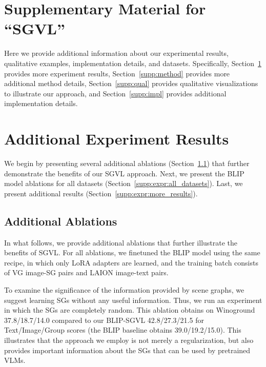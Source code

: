 \documentclass[11pt]{article}
\def\Secref#1{Section~\ref{#1}}
\newcommand{\minisection}[1]{\noindent{\textbf{#1}.}}
\newcommand{\smodel}{SGVL}
\def\Secref#1{Section~\ref{#1}}
\begin{document}






\newpage
\appendix
\clearpage
\renewcommand{\thefootnote}{\fnsymbol{footnote}}
\setcounter{page}{1} \setcounter{section}{0} \section*{Supplementary Material for ``SGVL''}




Here we provide additional information about our experimental results, qualitative examples, implementation details, and datasets. Specifically, \Secref{supp:expr} provides more experiment results, \Secref{supp:method} provides more additional method details, \Secref{supp:qual} provides qualitative visualizations to illustrate our approach, and \Secref{supp:impl} provides additional implementation details.




\section{Additional Experiment Results}
\label{supp:expr}

We begin by presenting several additional ablations (\Secref{supp:expr:more_ablt}) that further demonstrate the benefits of our {\smodel} approach. Next, we present the BLIP model ablations for all datasets (\Secref{supp:expr:all_datasets}). Last, we present additional results (\Secref{supp:expr:more_results}). 






\subsection{Additional Ablations}
\label{supp:expr:more_ablt}

In what follows, we provide additional ablations that further illustrate the benefits of {\smodel}. For all ablations, we finetuned the BLIP model using the same recipe, in which only LoRA adapters are learned, and the training batch consists of VG image-SG pairs and LAION image-text pairs. 






\minisection{The importance of the SG data} To examine the significance of the information provided by scene graphs, we suggest learning SGs without any useful information. Thus, we run an experiment in which the SGs are completely random. This ablation obtains on Winoground 37.8/18.7/14.0 compared to our BLIP-SGVL 42.8/27.3/21.5 for Text/Image/Group scores (the BLIP baseline obtains 39.0/19.2/15.0). This illustrates that the approach we employ is not merely a regularization, but also provides important information about the SGs that can be used by pretrained VLMs.
\end{document}
